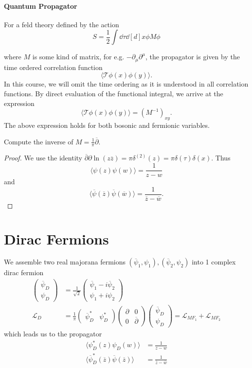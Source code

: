 \documentclass[twoside,symmetric, openany, 12pt]{./tuftebook}
\theoremstyle{definition}
\theoremstyle{definition}
\theoremstyle{definition}
\begin{document}
\paragraph{Quantum Propagator}
For a feld theory defined by the action
\[
	S = \frac{1}{2}\int \dd{\tau}\dd[d]{x} \phi M \phi
\]

where $M$ is some kind of matrix, for e.g. $-\partial_\mu\partial^\mu$, the propagator is given by the time ordered correlation function
\[
\langle \mathcal{T}\phi(x) \phi(y)\rangle
.\] 
In this course, we will omit the time ordering as it is understood in all correlation functions. By direct evaluation of the functional integral, we arrive at the expression 
\[
	\langle \mathcal{T}\phi(x)\phi(y)\rangle = (M^{-1})_{xy}
.\] 
The above expression holds for both bosonic and fermionic variables.
\begin{Example}
	Compute the inverse of $M=\frac{1}{\pi}\overline{\partial}$. 
\end{Example}
\begin{proof}
	We use the identity $\overline{\partial}\partial \ln (z \overline{z}) = \pi \delta^{(2)}(z)=\pi \delta(\tau)\delta(x)$. Thus 
	\[
	\langle \psi(z) \psi(w)\rangle = \frac{1}{z-w}
\]
and
\[
\langle \overline{\psi}(\overline{z})\overline{\psi}(\overline{w})\rangle = \frac{1}{\overline{z}-\overline{w}}
.\] 
\end{proof}
\section{Dirac Fermions}
We assemble two real majorana fermions $(\overline{\psi}_1, \psi_1), (\overline{\psi}_2, \psi_2)$ into 1 complex dirac fermion
\begin{align*}
	\begin{pmatrix} \overline{\psi}_D \\ \psi_D \end{pmatrix} &= \frac{1}{\sqrt{2} } \begin{pmatrix}  \overline{\psi}_1 - i \overline{\psi}_2 \\ \psi_1 + i\psi_2 \end{pmatrix} \\
	\mathcal{L}_D &=  \frac{1}{\pi} \begin{pmatrix} \overline{\psi}_D^* & \psi_D^* \end{pmatrix} \begin{pmatrix} \partial & 0 \\ 0 & \overline{\partial} \end{pmatrix} \begin{pmatrix} \overline{\psi}_D \\ \psi_D\end{pmatrix} =\mathcal{L}_{MF_1} + \mathcal{L}_{MF_2} 
\end{align*}
which leads us to the propagator
\begin{align*}
	\langle \psi_D^*(z) \psi_D(w) \rangle &= \frac{1}{z-w}\\
	\langle \overline{\psi}_D^*(\overline{z}) \overline{\psi}(\overline{z})\rangle &= \frac{1}{\overline{z}-\overline{w}}
\end{align*}
\end{document}
